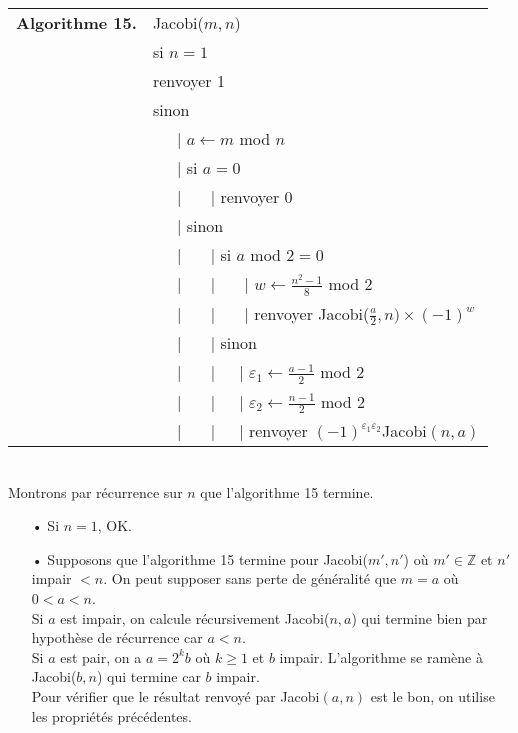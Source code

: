 \documentclass[12pt]{report}
\begin{document}
\begin{tabular}{ll}
\textbf{Algorithme 15.} & Jacobi($m,n$)\\
           & si $n= 1$ \\
           & renvoyer 1 \\
           & sinon \\
           & \ \ \ {\rm |} $a \leftarrow m$ mod $n$ \\
           & \ \ \ {\rm |} si $a=0$  \\
           & \ \ \ {\rm |} \ \ \ {\rm |} renvoyer 0 \\
           &  \ \ \ {\rm |} sinon  \\
           & \ \ \ {\rm |} \ \ \ {\rm |} si $a$ mod 2$=0$ \\
           & \ \ \ {\rm |} \ \ \ {\rm |} \ \ \ {\rm|} $w \leftarrow \tfrac{n^2-1}{8}$ mod $2$ \\
           & \ \ \ {\rm |} \ \ \ {\rm |} \ \ \ {\rm |} renvoyer Jacobi($\tfrac{a}{2},n)\times (-1)^w$ \\           
           & \ \ \ {\rm |} \ \ \ {\rm |} sinon \\
           & \ \ \ {\rm |} \ \ \ {\rm |}\ \ \ {\rm |} $ \varepsilon_1   \leftarrow \tfrac{a-1}{2}$ mod $2$ \\
           & \ \ \ {\rm |} \ \ \ {\rm |}\ \ \ {\rm |} $ \varepsilon_2   \leftarrow \tfrac{n-1}{2}$ mod $2$ \\
           & \ \ \ {\rm |} \ \ \ {\rm |}\ \ \ {\rm |} renvoyer $(-1)^{\varepsilon_1 \varepsilon_2}$Jacobi$(n,a)$
\end{tabular}\\


Montrons par récurrence sur $n$ que l'algorithme 15 termine.
\begin{itemize}
\item[•] Si $n=1$, OK.
\item[•] Supposons que l'algorithme 15 termine pour Jacobi($m',n'$) où $m'\in \mathbb{Z}$ et $n'$ impair $<n$. On peut supposer sans perte de généralité que $m=a$ où $0<a<n$.\\
Si $a$ est impair, on calcule récursivement Jacobi($n,a$) qui termine bien par hypothèse de récurrence car $a<n$.\\
Si $a$ est pair, on a $a=2^kb$ où $k \geq 1$ et $b$ impair. L'algorithme se ramène à Jacobi($b,n$) qui termine car $b$ impair. \\
Pour vérifier que le résultat renvoyé par Jacobi$(a,n)$ est le bon, on utilise les propriétés précédentes.
\end{itemize}
\end{document}
